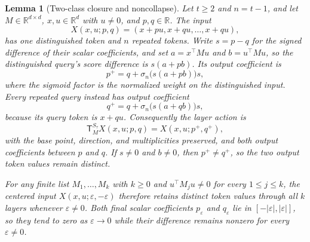 \documentclass[mlmain]{jmlr}
\newcommand{\T}{\mathsf{T}}
\newtheorem{mylemma}{Lemma}
\begin{document}
\begin{mylemma}[Two-class closure and noncollapse]
\label{lem:two-class-closure}
Let $t\ge2$ and $n=t-1$, and let $M\in\mathbb R^{d\times d}$,
$x,u\in\mathbb R^d$ with $u\ne0$, and $p,q\in\mathbb R$.  The input
\begin{equation}
 X(x,u;p,q)=(x+pu,x+qu,\ldots,x+qu),
 \label{eq:two-class-input}
\end{equation}
has one distinguished token and $n$ repeated tokens.  Write $s=p-q$ for
the signed difference of their scalar coefficients, and set $a=x^\top Mu$
and $b=u^\top Mu$, so the distinguished query's score difference is
$s(a+pb)$.  Its output coefficient is
\begin{equation}
 p^+=q+\sigma_n\!\bigl(s(a+pb)\bigr)s,
 \label{eq:two-class-p-update}
\end{equation}
where the sigmoid factor is the normalized weight on the distinguished
input.  Every repeated query instead has output coefficient
\begin{equation}
 q^+=q+\sigma_n\!\bigl(s(a+qb)\bigr)s,
 \label{eq:two-class-q-update}
\end{equation}
because its query token is $x+qu$.  Consequently the layer action is
\begin{equation}
 \T_M^{S_\tau}X(x,u;p,q)=X(x,u;p^+,q^+),
 \label{eq:two-class-exact-closure}
\end{equation}
with the base point, direction, and multiplicities preserved, and both
output coefficients between $p$ and $q$.  If $s\ne0$ and $b\ne0$, then
$p^+\ne q^+$, so the two output token values remain distinct.

For any finite list $M_1,\ldots,M_k$ with $k\ge0$ and
$u^\top M_j u\ne0$ for every $1\le j\le k$, the centered input
$X(x,u;\varepsilon,-\varepsilon)$ therefore retains distinct token values
through all $k$ layers whenever $\varepsilon\ne0$.  Both final scalar
coefficients $p_\varepsilon$ and $q_\varepsilon$ lie in
$[-|\varepsilon|,|\varepsilon|]$, so they tend to zero as
$\varepsilon\to0$ while their difference remains nonzero for every
$\varepsilon\ne0$.
\end{mylemma}
\end{document}
